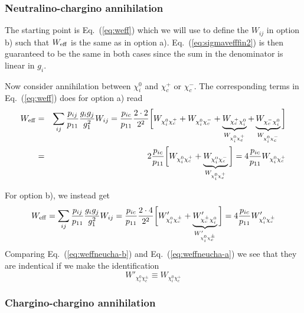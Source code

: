 \subsubsection{Neutralino-chargino annihilation}

The starting point is Eq.~(\ref{eq:weff}) which we will use to define 
the $W_{ij}$ in option b) such that $W_{\rm eff}$ is the same as in 
option a). Eq.~(\ref{eq:sigmavefffin2}) is then guaranteed to be the 
same in both cases since the sum in the denominator is linear in $g_{i}$.

Now consider annihilation between $\chi_{i}^0$ and $\chi_{c}^+$ or 
$\chi_{c}^-$. The corresponding terms in Eq.~(\ref{eq:weff}) does for 
option a) read
\begin{eqnarray}
    W_{\rm eff} & = & \sum_{ij}\frac{p_{ij}}{p_{11}} 
    \frac{g_{i}g_{j}}{g_{1}^2} W_{ij}
    =
    \frac{p_{ic}}{p_{11}} \frac{2 \cdot 2}{2^2}
    \bigg[ 
    W_{\chi_{i}^0 \chi_{c}^+} +
    W_{\chi_{i}^0 \chi_{c}^-} +
    \underbrace{W_{\chi_{c}^+ \chi_{i}^0}}_{W_{\chi_{i}^0 \chi_{c}^+}} +
    \underbrace{W_{\chi_{c}^- \chi_{i}^0}}_{W_{\chi_{i}^0 \chi_{c}^-}}
    \bigg] \nonumber \\
    & = & 2 \frac{p_{ic}}{p_{11}} 
    \bigg[
    W_{\chi_{i}^0 \chi_{c}^+} +
    \underbrace{W_{\chi_{i}^0 \chi_{c}^-}}_{W_{\chi_{i}^0 \chi_{c}^+}}
    \bigg]
    = 4 \frac{p_{ic}}{p_{11}} 
    W_{\chi_{i}^0 \chi_{c}^+}
    \label{eq:weffneucha-a}
\end{eqnarray}

For option b), we instead get
\begin{equation}
    W_{\rm eff} = \sum_{ij}\frac{p_{ij}}{p_{11}} 
    \frac{g_{i}g_{j}}{g_{1}^2} W_{ij}
    =
    \frac{p_{ic}}{p_{11}} \frac{2 \cdot 4}{2^2}
    \bigg[ 
    W'_{\chi_{i}^0 \chi_{c}^\pm} +
    \underbrace{W'_{\chi_{c}^\pm \chi_{i}^0}}_{W'_{\chi_{i}^0 \chi_{c}^\pm}}
    \bigg]
    =
    4 \frac{p_{ic}}{p_{11}} W'_{\chi_{i}^0 \chi_{c}^\pm}
    \label{eq:weffneucha-b}
\end{equation}
Comparing Eq.~(\ref{eq:weffneucha-b}) and Eq.~(\ref{eq:weffneucha-a}) 
we see that they are indentical if we make the identification
\begin{equation}
    W'_{\chi_{i}^0 \chi_{c}^\pm} \equiv W_{\chi_{i}^0 \chi_{c}^+}
\end{equation}

\subsubsection{Chargino-chargino annihilation}

